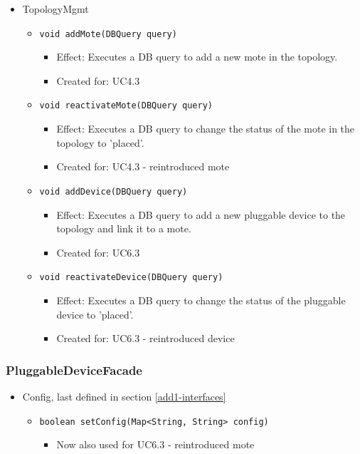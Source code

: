 \begin{itemize}
        	\item TopologyMgmt
        	\begin{itemize}
        		\item \texttt{void addMote(DBQuery query)}
        		\begin{itemize}
                    \item Effect: Executes a DB query to add a new mote in the topology.
        			\item Created for: UC4.3
        		\end{itemize}
                \item \texttt{void reactivateMote(DBQuery query)}
                    \begin{itemize}
                        \item Effect: Executes a DB query to change the status of the mote in the topology to 'placed'.
                        \item Created for: UC4.3 - reintroduced mote
                    \end{itemize}
                \item \texttt{void addDevice(DBQuery query)}
                    \begin{itemize}
                        \item Effect: Executes a DB query to add a new pluggable device to the topology and link it to a mote.
                        \item Created for: UC6.3
                    \end{itemize}
                \item \texttt{void reactivateDevice(DBQuery query)}
                    \begin{itemize}
                        \item Effect: Executes a DB query to change the status of the pluggable device to 'placed'.
                        \item Created for: UC6.3 - reintroduced device
                    \end{itemize}
        	\end{itemize}
        \end{itemize}

    \subsubsection{PluggableDeviceFacade}
        \begin{itemize}
        	\item Config, last defined in section \ref{add1-interfaces}
        	\begin{itemize}
                \item \texttt{boolean setConfig(Map<String, String> config)}
                    \begin{itemize}
                        \item Now also used for UC6.3 - reintroduced mote
                    \end{itemize}
            \end{itemize}
        \end{itemize}

